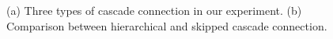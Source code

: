 \begin{figure}[h]
	\centering
	\caption{(a) Three types of cascade connection in our experiment.
			(b) Comparison between hierarchical and skipped cascade connection.}
	\label{fig:cascade_connection_type}
	\vspace{-10pt}
\end{figure}
